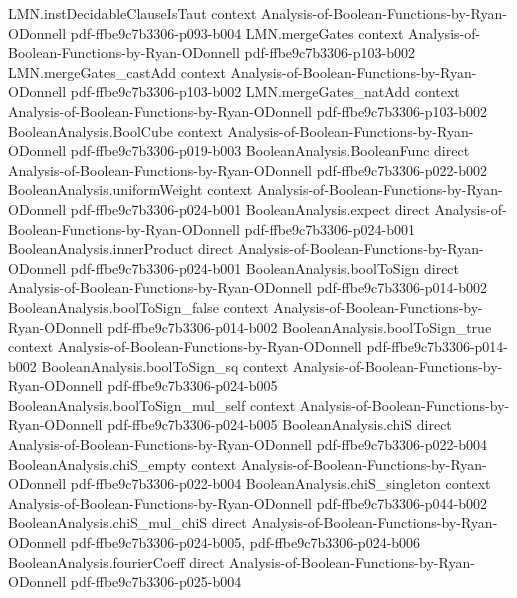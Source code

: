 \begin{lemma}
  {LMN.instDecidableClauseIsTaut}
  {context}
  {Analysis-of-Boolean-Functions-by-Ryan-ODonnell}
  {pdf-ffbe9c7b3306-p093-b004}
\proofstep
  {LMN.mergeGates}
  {context}
  {Analysis-of-Boolean-Functions-by-Ryan-ODonnell}
  {pdf-ffbe9c7b3306-p103-b002}
\proofstep
  {LMN.mergeGates_castAdd}
  {context}
  {Analysis-of-Boolean-Functions-by-Ryan-ODonnell}
  {pdf-ffbe9c7b3306-p103-b002}
\proofstep
  {LMN.mergeGates_natAdd}
  {context}
  {Analysis-of-Boolean-Functions-by-Ryan-ODonnell}
  {pdf-ffbe9c7b3306-p103-b002}
\proofstep
  {BooleanAnalysis.BoolCube}
  {context}
  {Analysis-of-Boolean-Functions-by-Ryan-ODonnell}
  {pdf-ffbe9c7b3306-p019-b003}
\proofstep
  {BooleanAnalysis.BooleanFunc}
  {direct}
  {Analysis-of-Boolean-Functions-by-Ryan-ODonnell}
  {pdf-ffbe9c7b3306-p022-b002}
\proofstep
  {BooleanAnalysis.uniformWeight}
  {context}
  {Analysis-of-Boolean-Functions-by-Ryan-ODonnell}
  {pdf-ffbe9c7b3306-p024-b001}
\proofstep
  {BooleanAnalysis.expect}
  {direct}
  {Analysis-of-Boolean-Functions-by-Ryan-ODonnell}
  {pdf-ffbe9c7b3306-p024-b001}
\proofstep
  {BooleanAnalysis.innerProduct}
  {direct}
  {Analysis-of-Boolean-Functions-by-Ryan-ODonnell}
  {pdf-ffbe9c7b3306-p024-b001}
\proofstep
  {BooleanAnalysis.boolToSign}
  {direct}
  {Analysis-of-Boolean-Functions-by-Ryan-ODonnell}
  {pdf-ffbe9c7b3306-p014-b002}
\proofstep
  {BooleanAnalysis.boolToSign_false}
  {context}
  {Analysis-of-Boolean-Functions-by-Ryan-ODonnell}
  {pdf-ffbe9c7b3306-p014-b002}
\proofstep
  {BooleanAnalysis.boolToSign_true}
  {context}
  {Analysis-of-Boolean-Functions-by-Ryan-ODonnell}
  {pdf-ffbe9c7b3306-p014-b002}
\proofstep
  {BooleanAnalysis.boolToSign_sq}
  {context}
  {Analysis-of-Boolean-Functions-by-Ryan-ODonnell}
  {pdf-ffbe9c7b3306-p024-b005}
\proofstep
  {BooleanAnalysis.boolToSign_mul_self}
  {context}
  {Analysis-of-Boolean-Functions-by-Ryan-ODonnell}
  {pdf-ffbe9c7b3306-p024-b005}
\proofstep
  {BooleanAnalysis.chiS}
  {direct}
  {Analysis-of-Boolean-Functions-by-Ryan-ODonnell}
  {pdf-ffbe9c7b3306-p022-b004}
\proofstep
  {BooleanAnalysis.chiS_empty}
  {context}
  {Analysis-of-Boolean-Functions-by-Ryan-ODonnell}
  {pdf-ffbe9c7b3306-p022-b004}
\proofstep
  {BooleanAnalysis.chiS_singleton}
  {context}
  {Analysis-of-Boolean-Functions-by-Ryan-ODonnell}
  {pdf-ffbe9c7b3306-p044-b002}
\proofstep
  {BooleanAnalysis.chiS_mul_chiS}
  {direct}
  {Analysis-of-Boolean-Functions-by-Ryan-ODonnell}
  {pdf-ffbe9c7b3306-p024-b005,
    pdf-ffbe9c7b3306-p024-b006}
\proofstep
  {BooleanAnalysis.fourierCoeff}
  {direct}
  {Analysis-of-Boolean-Functions-by-Ryan-ODonnell}
  {pdf-ffbe9c7b3306-p025-b004}

\end{lemma}
